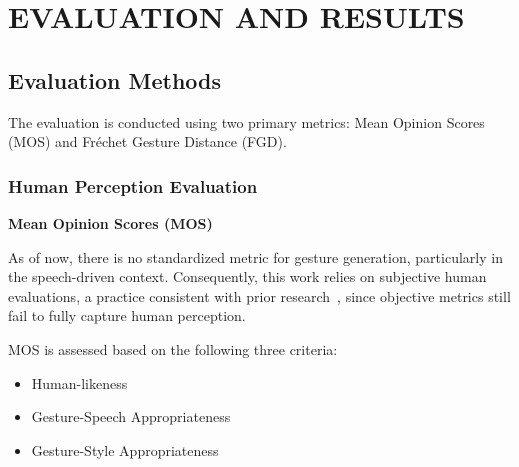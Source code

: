 \section{EVALUATION AND RESULTS}
\label{chap:evalution}

\subsection{Evaluation Methods}

The evaluation is conducted using two primary metrics: Mean Opinion Scores (MOS) and Fréchet Gesture Distance (FGD).

\subsubsection{Human Perception Evaluation}

\textbf{Mean Opinion Scores (MOS)}

As of now, there is no standardized metric for gesture generation, particularly in the speech-driven context. Consequently, this work relies on subjective human evaluations, a practice consistent with prior research~\cite{yoon2022genea, kucherenko2021large, alexanderson2022listen}, since objective metrics still fail to fully capture human perception.

MOS is assessed based on the following three criteria:

\begin{itemize}
	\item Human-likeness
	\item Gesture-Speech Appropriateness
	\item Gesture-Style Appropriateness
\end{itemize}

%


